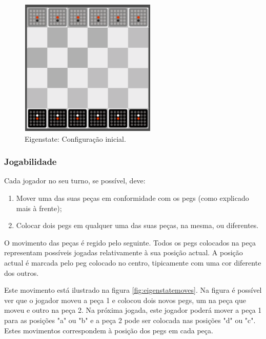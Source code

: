 \documentclass[paper=a4, fontsize=11pt]{scrartcl} %
\numberwithin{equation}{section} %
\numberwithin{figure}{section} %
\numberwithin{table}{section} %
\begin{document}
\begin{figure}[tb]
	\centering
	\includegraphics{eigenstate}
	\caption[Eigenstate Setup Inicial]{Eigenstate: Configuração inicial. \cite{eigenstaterules:2018}} %
	\label{fig:eigenstatestup} 
\end{figure}

\subsubsection{Jogabilidade}

Cada jogador no seu turno, se possível, deve:

\begin{enumerate}
	\item Mover uma das suas peças em conformidade com os pegs (como explicado mais à frente);
	\item Colocar dois pegs em qualquer uma das suas peças, na mesma, ou diferentes.
\end{enumerate}

O movimento das peças é regido pelo seguinte. Todos os pegs colocados na peça representam possíveis jogadas relativamente à sua posição actual. A posição actual é marcada pelo peg colocado no centro, tipicamente com uma cor diferente dos outros.

Este movimento está ilustrado na figura \ref{fig:eigenstatemoves}. Na figura é possível ver que o jogador moveu a peça 1 e colocou dois novos pegs, um na peça que moveu e outro na peça 2. Na próxima jogada, este jogador poderá mover a peça 1 para as posições "a" ou "b" e a peça 2 pode ser colocada nas posições "d" ou "c". Estes movimentos correspondem à posição dos pegs em cada peça.
\end{document}
